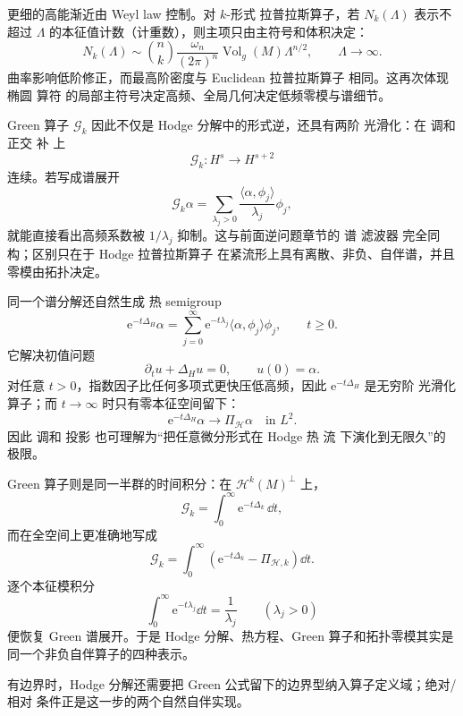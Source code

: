 更细的高能渐近由 Weyl law 控制。对 $k$-形式 拉普拉斯算子，若 $N_k(\Lambda)$ 表示不超过 $\Lambda$ 的本征值计数（计重数），则主项只由主符号和体积决定：
\begin{equation*}N_k(\Lambda)
\sim
\binom{n}{k}
\frac{\omega_n}{(2\pi)^n}
\operatorname{Vol}_g(M)
\Lambda^{n/2},
\qquad \Lambda\to\infty.\end{equation*}
曲率影响低阶修正，而最高阶密度与 Euclidean 拉普拉斯算子 相同。这再次体现 椭圆 算符 的局部主符号决定高频、全局几何决定低频零模与谱细节。

Green 算子 $\mathcal G_k$ 因此不仅是 Hodge 分解中的形式逆，还具有两阶 光滑化：在 调和 正交 补 上
\[
\mathcal G_k:H^s\to H^{s+2}
\]
连续。若写成谱展开
\[
\mathcal G_k\alpha
=\sum_{\lambda_j>0}
\frac{\langle\alpha,\phi_j\rangle}{\lambda_j}\phi_j,
\]
就能直接看出高频系数被 $1/\lambda_j$ 抑制。这与前面逆问题章节的 谱 滤波器 完全同构；区别只在于 Hodge 拉普拉斯算子 在紧流形上具有离散、非负、自伴谱，并且零模由拓扑决定。

同一个谱分解还自然生成 热 semigroup
\begin{equation*}\mathrm e^{-t\Delta_H}\alpha
=\sum_{j=0}^{\infty}
\mathrm e^{-t\lambda_j}
\langle\alpha,\phi_j\rangle\phi_j,
\qquad t\ge0.\end{equation*}
它解决初值问题
\[
\partial_tu+\Delta_Hu=0,
\qquad
u(0)=\alpha.
\]
对任意 $t>0$，指数因子比任何多项式更快压低高频，因此 $\mathrm e^{-t\Delta_H}$ 是无穷阶 光滑化 算子；而 $t\to\infty$ 时只有零本征空间留下：
\begin{equation*}\mathrm e^{-t\Delta_H}\alpha
\longrightarrow
\Pi_{\mathcal H}\alpha
\quad\text{in }L^2.\end{equation*}
因此 调和 投影 也可理解为“把任意微分形式在 Hodge 热 流 下演化到无限久”的极限。

Green 算子则是同一半群的时间积分：在 $\mathcal H^k(M)^\perp$ 上，
\begin{equation*}\boxed{
\mathcal G_k
=\int_0^{\infty}\mathrm e^{-t\Delta_k}\,\dd t,
}\end{equation*}
而在全空间上更准确地写成
\[
\mathcal G_k
=\int_0^{\infty}
\left(\mathrm e^{-t\Delta_k}-\Pi_{\mathcal H,k}\right)\dd t.
\]
逐个本征模积分
\[
\int_0^\infty\mathrm e^{-t\lambda_j}\dd t=\frac1{\lambda_j}
\qquad(\lambda_j>0)
\]
便恢复 Green 谱展开。于是 Hodge 分解、热方程、Green 算子和拓扑零模其实是同一个非负自伴算子的四种表示。

有边界时，Hodge 分解还需要把 Green 公式留下的边界型纳入算子定义域；绝对/相对 条件正是这一步的两个自然自伴实现。

